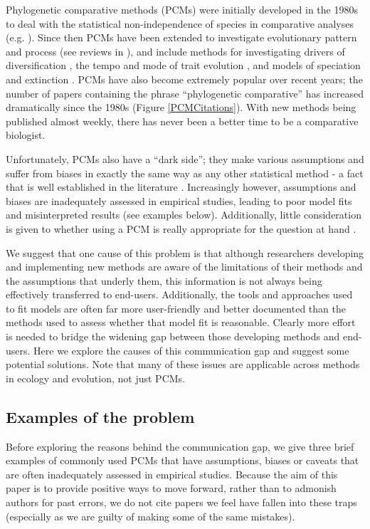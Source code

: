 \documentclass[a4paper,12pt]{article}
\begin{document}
Phylogenetic comparative methods (PCMs) were initially developed in the 1980s to deal with the statistical non-independence of species in comparative analyses (e.g. \citealp{felsenstein1985phylogenies,grafen1989phylogenetic}).  
Since then PCMs have been extended to investigate evolutionary pattern and process (see reviews in \citealp{o2012evolutionary, pennell2013integrative}), and include methods for investigating drivers of diversification \citep[e.g.][]{maddison2007estimating}, the tempo and mode of trait evolution \citep[e.g.][]{o2012evolutionary}, and models of speciation and extinction \citep[e.g.][]{nee1994extinction}. 
PCMs have also become extremely popular over recent years; the number of papers containing the phrase ``phylogenetic comparative'' has increased dramatically since the 1980s (Figure \ref{PCMCitations}). 
With new methods being published almost weekly, there has never been a better time to be a comparative biologist.

Unfortunately, PCMs also have a ``dark side''; they make various assumptions and suffer from biases in exactly the same way as any other statistical method - a fact that is well established in the literature \citep[e.g.][]{freckleton2009seven,losos2011seeing,blomberg2012independent,boettiger2012your}.
Increasingly however, assumptions and biases are inadequately assessed in empirical studies, leading to poor model fits and misinterpreted results (see examples below).
Additionally, little consideration is given to whether using a PCM is really appropriate for the question at hand \citep{westoby1995misinterpreting,losos2011seeing}. 

We suggest that one cause of this problem is that although researchers developing and implementing new methods are aware of the limitations of their methods and the assumptions that underly them, this information is not always being effectively transferred to end-users.
Additionally, the tools and approaches used to fit models are often far more user-friendly and better documented than the methods used to assess whether that model fit is reasonable. 
Clearly more effort is needed to bridge the widening gap between those developing methods and end-users. 
Here we explore the causes of this communication gap and suggest some potential solutions.
Note that many of these issues are applicable across methods in ecology and evolution, not just PCMs.

\subsection{Examples of the problem}
Before exploring the reasons behind the communication gap, we give three brief examples of commonly used PCMs that have assumptions, biases or caveats that are often inadequately assessed in empirical studies.
Because the aim of this paper is to provide positive ways to move forward, rather than to admonish authors for past errors, we do not cite papers we feel have fallen into these traps (especially as we are guilty of making some of the same mistakes). 
\end{document}
